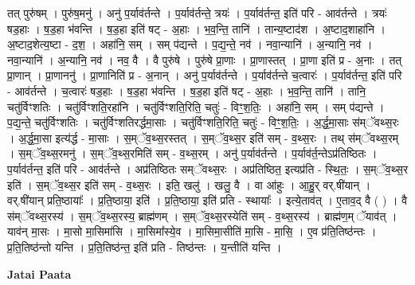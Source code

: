 \documentclass[17pt]{extarticle}
\begin{document}
तत् पुरु॑षम् । पुरु॑ष॒मनु॑ । अनु॑ प॒र्याव॑र्तन्ते । प॒र्याव॑र्तन्ते॒ त्रयः॑ । प॒र्याव॑र्तन्त॒ इति॑ परि - आव॑र्तन्ते । त्रयः॑ षड॒हाः । ष॒ड॒हा भ॑वन्ति । ष॒ड॒हा इति॑ षट् - अ॒हाः । भ॒व॒न्ति॒ तानि॑ । तान्य॒ष्टाद॑श । अ॒ष्टाद॒शाहा॑नि । अ॒ष्टाद॒शेत्य॒ष्टा - द॒श॒ । अहा॑नि॒ सम् । सम् प॑द्यन्ते । प॒द्य॒न्ते॒ नव॑ । नवा॒न्यानि॑ । अ॒न्यानि॒ नव॑ । नवा॒न्यानि॑ । अ॒न्यानि॒ नव॑ । नव॒ वै । वै पुरु॑षे । पुरु॑षे प्रा॒णाः । प्रा॒णास्तत् । प्रा॒णा इति॑ प्र - अ॒नाः । तत् प्रा॒णान् । प्रा॒णाननु॑ । प्रा॒णानिति॑ प्र - अ॒नान् । अनु॑ प॒र्याव॑र्तन्ते । प॒र्याव॑र्तन्ते च॒त्वारः॑ । प॒र्याव॑र्तन्त॒ इति॑ परि - आव॑र्तन्ते । च॒त्वारः॑ षड॒हाः । ष॒ड॒हा भ॑वन्ति । ष॒ड॒हा इति॑ षट् - अ॒हाः । भ॒व॒न्ति॒ तानि॑ । तानि॒ चतु॑र्विꣳशतिः । चतु॑र्विꣳशति॒रहा॑नि । चतु॑र्विꣳशति॒रिति॒ चतुः॑ - विꣳ॒॒श॒तिः॒ । अहा॑नि॒ सम् । सम् प॑द्यन्ते । प॒द्य॒न्ते॒ चतु॑र्विꣳशतिः । चतु॑र्विꣳशतिरर्द्धमा॒साः । चतु॑र्विꣳशति॒रिति॒ चतुः॑ - विꣳ॒॒श॒तिः॒ । अ॒र्द्ध॒मा॒साः स॑म्ॅवथ्स॒रः । अ॒र्द्ध॒मा॒सा इत्य॑र्द्ध - मा॒साः । स॒म्ॅव॒थ्स॒रस्तत् । स॒म्ॅव॒थ्स॒र इति॑ सम् - व॒थ्स॒रः । तथ् स॑म्ॅवथ्स॒रम् । स॒म्ॅव॒थ्स॒रमनु॑ । स॒म्ॅव॒थ्स॒रमिति॑ सम् - व॒थ्स॒रम् । अनु॑ प॒र्याव॑र्तन्ते । प॒र्याव॑र्त॒न्तेऽप्र॑तिष्ठितः । प॒र्याव॑र्तन्त॒ इति॑ परि - आव॑र्तन्ते । अप्र॑तिष्ठितः सम्ॅवथ्स॒रः । अप्र॑तिष्ठित॒ इत्यप्र॑ति - स्थि॒तः॒ । स॒म्ॅव॒थ्स॒र इति॑ । स॒म्ॅव॒थ्स॒र इति॑ सम् - व॒थ्स॒रः । इति॒ खलु॑ । खलु॒ वै । वा आ॑हुः । आ॒हु॒र् वर्.षी॑यान् । वर्.षी॑यान् प्रति॒ष्ठायाः᳚ । प्र॒ति॒ष्ठाया॒ इति॑ । प्र॒ति॒ष्ठाया॒ इति॑ प्रति - स्थायाः᳚ । इत्ये॒ताव॑त् । ए॒ताव॒द् वै ( ) । वै स॑म्ॅवथ्स॒रस्य॑ । स॒म्ॅव॒थ्स॒रस्य॒ ब्राह्म॑णम् । स॒म्ॅव॒थ्स॒रस्येति॑ सम् - व॒थ्स॒रस्य॑ । ब्राह्म॑ण॒म् ॅयाव॑त् । याव॑न् मा॒सः । मा॒सो मा॒सिमा॑सि । मा॒सिमा᳚स्ये॒व । मा॒सिमा॒सीति॑ मा॒सि - मा॒सि॒ । ए॒व प्र॑ति॒तिष्ठ॑न्तः । प्र॒ति॒तिष्ठ॑न्तो यन्ति । प्र॒ति॒तिष्ठ॑न्त॒ इति॑ प्रति - तिष्ठ॑न्तः । य॒न्तीति॑ यन्ति । \newline

\textbf{Jatai Paata} \newline
\end{document}
